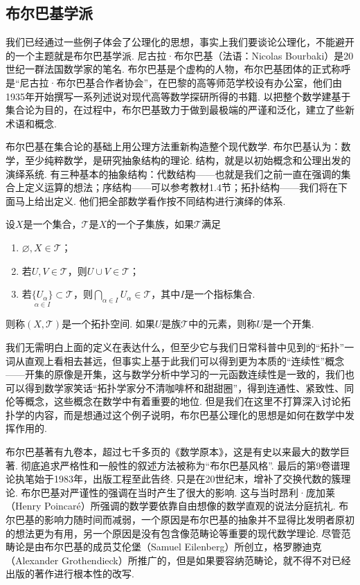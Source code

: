 \subsection{布尔巴基学派}

我们已经通过一些例子体会了公理化的思想，事实上我们要谈论公理化，不能避开的一个主题就是布尔巴基学派. 尼古拉·布尔巴基（法语：Nicolas Bourbaki）是20世纪一群法国数学家的笔名. 布尔巴基是个虚构的人物，布尔巴基团体的正式称呼是``尼古拉·布尔巴基合作者协会''，在巴黎的高等师范学校设有办公室，他们由1935年开始撰写一系列述说对现代高等数学探研所得的书籍. 以把整个数学建基于集合论为目的，在过程中，布尔巴基致力于做到最极端的严谨和泛化，建立了些新术语和概念.

布尔巴基在集合论的基础上用公理方法重新构造整个现代数学. 布尔巴基认为：数学，至少纯粹数学，是研究抽象结构的理论. 结构，就是以初始概念和公理出发的演绎系统. 有三种基本的抽象结构：代数结构——也就是我们之前一直在强调的集合上定义运算的想法；序结构——可以参考教材1.4节；拓扑结构——我们将在下面马上给出定义. 他们把全部数学看作按不同结构进行演绎的体系.

\begin{definition}{}{}
    设$X$是一个集合，$\mathscr{T}$是$X$的一个子集族，如果$\mathscr{T}$满足
    \begin{enumerate}
        \item $\varnothing,X\in \mathscr{T}$；

        \item 若$U,V\in \mathscr{T}$，则$U\cup V\in \mathscr{T}$；

        \item 若$\underset{\alpha\in I}{\{U_\alpha\}}\subset \mathscr{T}$，则$\bigcap\limits_{\alpha\in I}U_\alpha\in \mathscr{T}$，其中$I$是一个指标集合.
    \end{enumerate}
    则称$(X,\mathscr{T})$是一个拓扑空间. 如果$U$是族$\mathscr{T}$中的元素，则称$U$是一个开集.
\end{definition}

我们无需明白上面的定义在表达什么，但至少它与我们日常科普中见到的``拓扑''一词从直观上看相去甚远，但事实上基于此我们可以得到更为本质的``连续性''概念——开集的原像是开集，这与数学分析中学习的一元函数连续性是一致的，我们也可以得到数学家笑话``拓扑学家分不清咖啡杯和甜甜圈''，得到连通性、紧致性、同伦等概念，这些概念在数学中有着重要的地位. 但是我们在这里不打算深入讨论拓扑学的内容，而是想通过这个例子说明，布尔巴基公理化的思想是如何在数学中发挥作用的.

布尔巴基著有九卷本，超过七千多页的《数学原本》，这是有史以来最大的数学巨著. 彻底追求严格性和一般性的叙述方法被称为``布尔巴基风格''. 最后的第9卷谱理论执笔始于1983年，出版工程至此告终. 只是在20世纪末，增补了交换代数的簇理论. 布尔巴基对严谨性的强调在当时产生了很大的影响. 这与当时昂利·庞加莱（Henry Poincar\'e）所强调的数学要依靠自由想像的数学直观的说法分庭抗礼. 布尔巴基的影响力随时间而减弱，一个原因是布尔巴基的抽象并不显得比发明者原初的想法更为有用，另一个原因是没有包含像范畴论等重要的现代数学理论. 尽管范畴论是由布尔巴基的成员艾伦堡（Samuel Eilenberg）所创立，格罗滕迪克（Alexander Grothendieck）所推广的，但是如果要容纳范畴论，就不得不对已经出版的著作进行根本性的改写.

